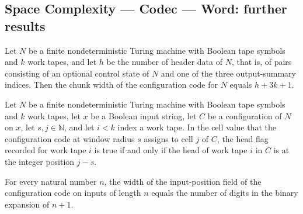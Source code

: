 \subsection*{Space Complexity --- Codec --- Word: further results}

\begin{lemma}
\label{Complexity.Codec.W_eq}
\leanok
{}
Let $N$ be a finite nondeterministic Turing machine with Boolean tape symbols and $k$
work tapes, and let $h$ be the number of header data of $N$, that is, of pairs
consisting of an optional control state of $N$ and one of the three output-summary
indices. Then the chunk width of the configuration code for $N$ equals $h+3k+1$.
\end{lemma}

\begin{lemma}
\label{Complexity.Codec.cellOf_head}
\leanok
{}
Let $N$ be a finite nondeterministic Turing machine with Boolean tape symbols and $k$
work tapes, let $x$ be a Boolean input string, let $C$ be a configuration of $N$ on $x$,
let $s,j\in\mathbb{N}$, and let $i<k$ index a work tape. In the cell value that the
configuration code at window radius $s$ assigns to cell $j$ of $C$, the head flag
recorded for work tape $i$ is true if and only if the head of work tape $i$ in $C$ is at
the integer position $j-s$.
\end{lemma}

\begin{lemma}
\label{Complexity.Codec.wP_eq}
\leanok
{}
For every natural number $n$, the width of the input-position field of the
configuration code on inputs of length $n$ equals the number of digits in the binary
expansion of $n+1$.
\end{lemma}
